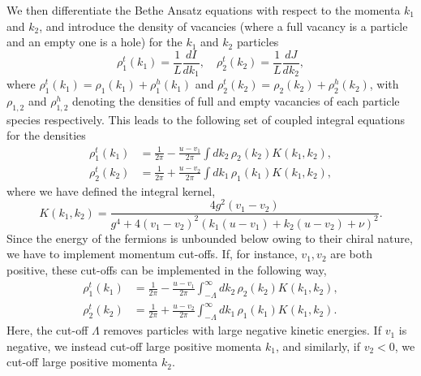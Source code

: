 \documentclass[aps,pra,
superscriptaddress,
reprint,twocolumn,preprintnumbers,
amsmath,amssymb,
nofootinbib]{revtex4-1}
\begin{document}
We then differentiate the Bethe Ansatz equations with respect to the momenta $k_1$ and $k_2$, and introduce the density of vacancies (where a full vacancy is a particle and an empty one is a hole) for the $k_1$ and $k_2$ particles
		\begin{equation}
		\rho^t_1(k_1) = \frac{1}{L} \frac{dI}{d k_1} ,\quad \rho_2^t(k_2) = \frac{1}{L} \frac{dJ}{d k_2},
		\end{equation}
where $\rho_1^t(k_1) = \rho_1(k_1) + \rho^h_1(k_1)$ and $\rho^t_2(k_2) = \rho_2(k_2) + \rho_2^h(k_2)$, with $\rho_{1,2}$ and $\rho^h_{1,2}$ denoting the densities of full and empty vacancies of each particle species respectively. This leads to the following set of coupled integral equations for the densities
		\begin{align}
		\label{eqn:17}
		\rho_1^t(k_1) & =  \frac{1}{2\pi} - \frac{u - v_1}{2\pi}\int dk_2\,\rho_2(k_2)K(k_1,k_2) ,\nonumber \\
		\rho_2^t(k_2) & =  \frac{1}{2\pi} + \frac{u - v_2}{2\pi}\int dk_1 \,\rho_1(k_1)K(k_1,k_2),
		\end{align}
where we have defined the integral kernel,
        \begin{equation}
        \label{eqn:18}
        K(k_1, k_2) = \frac{4 g^2 (v_1 - v_2)}{g^4 + 4 (v_1 - v_2)^2 \left(k_1(u - v_1) + k_2(u - v_2) + \nu\right)^2}.
        \end{equation}
Since the energy of the fermions is unbounded below owing to their chiral nature, we have to implement momentum cut-offs. If, for instance, $v_1, v_2$ are both positive, these cut-offs can be implemented in the following way,
		\begin{align}
		\rho_1^t(k_1) & =  \frac{1}{2\pi} - \frac{u - v_1}{2\pi}\int_{-\Lambda}^{\infty} dk_2\,\rho_2(k_2) K(k_1,k_2), \nonumber \\
		\rho_2^t(k_2) & =  \frac{1}{2\pi} + \frac{u - v_2}{2\pi}\int_{-\Lambda}^{\infty} dk_1\,\rho_1(k_1) K(k_1, k_2).
		\end{align}
Here, the cut-off $\Lambda$ removes particles with large negative kinetic energies. If $v_1$ is negative, we instead cut-off large positive momenta $k_1$, and similarly, if $v_2 < 0$, we cut-off large positive momenta $k_2$. 
\end{document}
